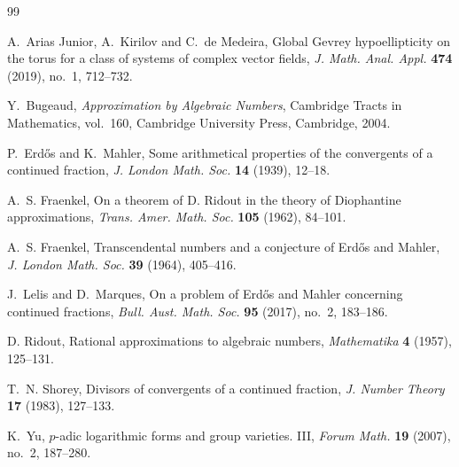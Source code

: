 \documentclass[11pt]{amsart}
\theoremstyle{remark}
\begin{document}
\begin{thebibliography}{99}

A.~Arias Junior, A.~Kirilov and C.~de Medeira,
Global Gevrey hypoellipticity on the torus for a class of systems of
complex vector fields,
\emph{J. Math. Anal. Appl.} \textbf{474} (2019), no.~1, 712--732.

Y.~Bugeaud,
\emph{Approximation by Algebraic Numbers},
Cambridge Tracts in Mathematics, vol.~160,
Cambridge University Press, Cambridge, 2004.

P.~Erd\H{o}s and K.~Mahler,
Some arithmetical properties of the convergents of a continued fraction,
\emph{J. London Math. Soc.} \textbf{14} (1939), 12--18.

A.~S. Fraenkel,
On a theorem of D. Ridout in the theory of Diophantine approximations,
\emph{Trans. Amer. Math. Soc.} \textbf{105} (1962), 84--101.

A.~S. Fraenkel,
Transcendental numbers and a conjecture of Erd\H{o}s and Mahler,
\emph{J. London Math. Soc.} \textbf{39} (1964), 405--416.

J.~Lelis and D.~Marques,
On a problem of Erd\H{o}s and Mahler concerning continued fractions,
\emph{Bull. Aust. Math. Soc.} \textbf{95} (2017), no.~2, 183--186.

 D. Ridout, Rational approximations to algebraic numbers, \textit{Mathematika} \textbf{4} (1957), 125--131.

T.~N. Shorey,
Divisors of convergents of a continued fraction,
\emph{J. Number Theory} \textbf{17} (1983), 127--133.

K.~Yu,
$p$-adic logarithmic forms and group varieties. III,
\emph{Forum Math.} \textbf{19} (2007), no.~2, 187--280.

\end{thebibliography}
\end{document}
